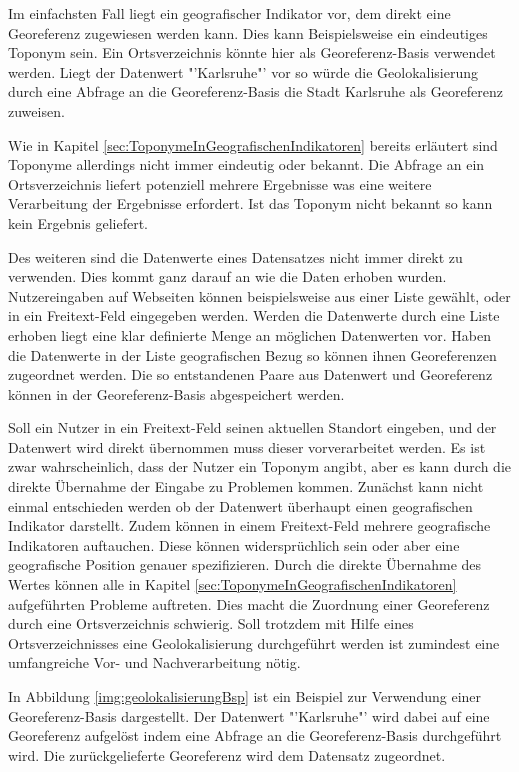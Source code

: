 		Im einfachsten Fall liegt ein geografischer Indikator vor, dem direkt eine Georeferenz zugewiesen werden kann.
		Dies kann Beispielsweise ein eindeutiges Toponym sein.	
		Ein Ortsverzeichnis könnte hier als Georeferenz-Basis verwendet werden.
		Liegt der Datenwert "'Karlsruhe"' vor so würde die Geolokalisierung durch eine Abfrage an die Georeferenz-Basis die Stadt Karlsruhe als Georeferenz zuweisen.

		Wie in Kapitel \ref{sec:ToponymeInGeografischenIndikatoren} bereits erläutert sind Toponyme allerdings nicht immer eindeutig oder bekannt. 
		Die Abfrage an ein Ortsverzeichnis liefert potenziell mehrere Ergebnisse was eine weitere Verarbeitung der Ergebnisse erfordert.
		Ist das Toponym nicht bekannt so kann kein Ergebnis geliefert.

		Des weiteren sind die Datenwerte eines Datensatzes nicht immer direkt zu verwenden.
		Dies kommt ganz darauf an wie die Daten erhoben wurden. 
		Nutzereingaben auf Webseiten können beispielsweise aus einer Liste gewählt, oder in ein Freitext-Feld eingegeben werden.
		Werden die Datenwerte durch eine Liste erhoben liegt eine klar definierte Menge an möglichen Datenwerten vor.
		Haben die Datenwerte in der Liste geografischen Bezug so können ihnen Georeferenzen zugeordnet werden.
		Die so entstandenen Paare aus Datenwert und Georeferenz können in der Georeferenz-Basis abgespeichert werden.

		Soll ein Nutzer in ein Freitext-Feld seinen aktuellen Standort eingeben, und der Datenwert wird direkt übernommen muss dieser vorverarbeitet werden.
		Es ist zwar wahrscheinlich, dass der Nutzer ein Toponym angibt, aber es kann durch die direkte Übernahme der Eingabe zu Problemen kommen.
		Zunächst kann nicht einmal entschieden werden ob der Datenwert überhaupt einen geografischen Indikator darstellt.
		Zudem können in einem Freitext-Feld mehrere geografische Indikatoren auftauchen.
		Diese können widersprüchlich sein oder aber eine geografische Position genauer spezifizieren. 
		Durch die direkte Übernahme des Wertes können alle in Kapitel \ref{sec:ToponymeInGeografischenIndikatoren} aufgeführten Probleme auftreten.
		Dies macht die Zuordnung einer Georeferenz durch eine Ortsverzeichnis schwierig.
		Soll trotzdem mit Hilfe eines Ortsverzeichnisses eine Geolokalisierung durchgeführt werden ist zumindest eine umfangreiche Vor- und Nachverarbeitung nötig.

		In Abbildung \ref{img:geolokalisierungBsp} ist ein Beispiel zur Verwendung einer Georeferenz-Basis dargestellt.
		Der Datenwert "'Karlsruhe"' wird dabei auf eine Georeferenz aufgelöst indem eine Abfrage an die Georeferenz-Basis durchgeführt wird.
		Die zurückgelieferte Georeferenz wird dem Datensatz zugeordnet.

